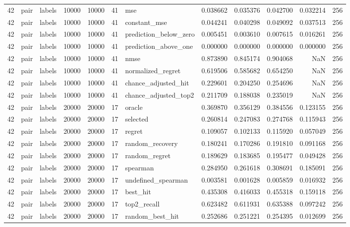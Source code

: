 \begin{tabular}{rllrrrlrrrrr}
42 & pair & labels & 10000 & 10000 & 41 & mse & 0.038662 & 0.035376 & 0.042700 & 0.032214 & 256 \\
42 & pair & labels & 10000 & 10000 & 41 & constant_mse & 0.044241 & 0.040298 & 0.049092 & 0.037513 & 256 \\
42 & pair & labels & 10000 & 10000 & 41 & prediction_below_zero & 0.005451 & 0.003610 & 0.007615 & 0.016261 & 256 \\
42 & pair & labels & 10000 & 10000 & 41 & prediction_above_one & 0.000000 & 0.000000 & 0.000000 & 0.000000 & 256 \\
42 & pair & labels & 10000 & 10000 & 41 & nmse & 0.873890 & 0.845174 & 0.904068 & NaN & 256 \\
42 & pair & labels & 10000 & 10000 & 41 & normalized_regret & 0.619506 & 0.585682 & 0.654250 & NaN & 256 \\
42 & pair & labels & 10000 & 10000 & 41 & chance_adjusted_hit & 0.229601 & 0.204250 & 0.254696 & NaN & 256 \\
42 & pair & labels & 10000 & 10000 & 41 & chance_adjusted_top2 & 0.211709 & 0.188038 & 0.235019 & NaN & 256 \\
42 & pair & labels & 20000 & 20000 & 17 & oracle & 0.369870 & 0.356129 & 0.384556 & 0.123155 & 256 \\
42 & pair & labels & 20000 & 20000 & 17 & selected & 0.260814 & 0.247083 & 0.274768 & 0.115943 & 256 \\
42 & pair & labels & 20000 & 20000 & 17 & regret & 0.109057 & 0.102133 & 0.115920 & 0.057049 & 256 \\
42 & pair & labels & 20000 & 20000 & 17 & random_recovery & 0.180241 & 0.170286 & 0.191810 & 0.091168 & 256 \\
42 & pair & labels & 20000 & 20000 & 17 & random_regret & 0.189629 & 0.183685 & 0.195477 & 0.049428 & 256 \\
42 & pair & labels & 20000 & 20000 & 17 & spearman & 0.284950 & 0.261618 & 0.308691 & 0.185091 & 256 \\
42 & pair & labels & 20000 & 20000 & 17 & undefined_spearman & 0.003581 & 0.001628 & 0.005859 & 0.016932 & 256 \\
42 & pair & labels & 20000 & 20000 & 17 & best_hit & 0.435308 & 0.416033 & 0.455318 & 0.159118 & 256 \\
42 & pair & labels & 20000 & 20000 & 17 & top2_recall & 0.623482 & 0.611931 & 0.635388 & 0.097242 & 256 \\
42 & pair & labels & 20000 & 20000 & 17 & random_best_hit & 0.252686 & 0.251221 & 0.254395 & 0.012699 & 256 \\

\end{tabular}

